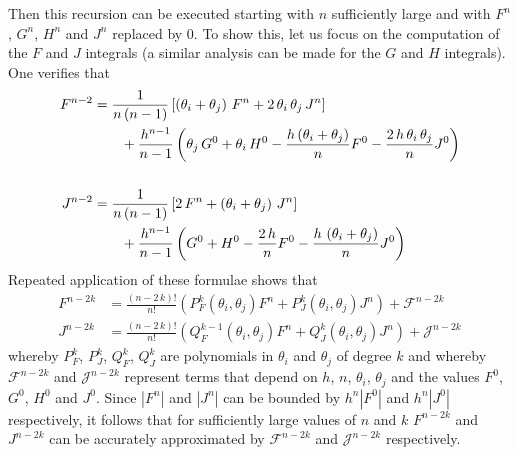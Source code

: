 Then this recursion can be executed starting with $n$ sufficiently large and with $F^n$, $G^n$, $H^n$ and $J^n$ replaced by 0.
To show this, let us focus on the computation of the $F$ and $J$ integrals (a similar analysis can be made for the $G$ and $H$ integrals).
One verifies that
\begin{align*} F^{n-2} & = \frac {  1 }{n \left( n-1 \right) }
  \left[ \left( \theta_i+\theta_j \right)\, F^n + 2\,\theta_i\,\theta_j\, J^n \right]                                                                                                       \\
          & \hspace{7mm} +  \frac{h^{n-1}}{n-1} \left( {\theta_j}\,G^0+\theta_i\,H^0-{\frac {h \left( \theta_i+\theta_j \right) }{n}} F^0-\frac {2\, h \,\theta_i\,\theta_j}{n} J^0 \right) \\
  \\
  J^{n-2} & =  \frac {  1 }{n \left( n-1 \right) }
  \left[ 2\,  F^n + \left( \theta_i+\theta_j\right)\, J^n \right]                                                                                                                           \\
          & \hspace{7mm} + \frac{h^{n-1}}{n-1} \left( G^0+ H^0-{\frac {2\,h  }{n}} F^0-\frac {h \,\left( \theta_i+\theta_j \right)}{n} J^0 \right)
\end{align*}
Repeated application of these formulae shows that %
\begin{align*}
  F^{n-2k} & = \frac{(n-2\,k)!}{n!} \left(P^k_F(\theta_i,\theta_j) F^n + P^k_J(\theta_i,\theta_j) J^n \right) + \mathcal{F}^{n-2k}     \\
  J^{n-2k} & = \frac{(n-2\,k)!}{n!} \left(Q^{k-1}_F(\theta_i,\theta_j) F^n + Q^k_J(\theta_i,\theta_j) J^n \right) + \mathcal{J}^{n-2k}
\end{align*}
whereby $P^k_F$, $P^k_J$, $Q^{k}_F$, $Q^k_J$ are polynomials in $\theta_i$ and $\theta_j$ of degree $k$ and whereby $\mathcal{F}^{n-2k}$ and $\mathcal{J}^{n-2k}$ represent terms that depend on $h$, $n$, $\theta_i$,   $\theta_j$ and the values $F^0$, $G^0$, $H^0$ and $J^0$.
Since $|F^n|$ and  $|J^n|$ can be bounded by $h^n |F^0|$ and $h^n |J^0|$ respectively, it follows that for sufficiently large values of $n$ and $k$
$F^{n-2k}$ and $J^{n-2k}$ can be accurately approximated by $\mathcal{F}^{n-2k}$ and $\mathcal{J}^{n-2k}$ respectively.

